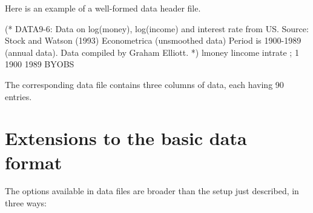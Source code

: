 Here is an example of a well-formed data header file.

	
\begin{code} 
  (* DATA9-6: Data on log(money), log(income) and interest rate from
  US.  Source: Stock and Watson (1993) Econometrica (unsmoothed data)
  Period is 1900-1989 (annual data).  Data compiled by Graham Elliott.
  *) lmoney lincome intrate ; 1 1900 1989 BYOBS
\end{code}



The corresponding data file contains three columns of data, each
having 90 entries.



\section{Extensions to the basic data format}
\label{extensions}


The options available in  data files are broader than the
setup just described, in three ways:
      


